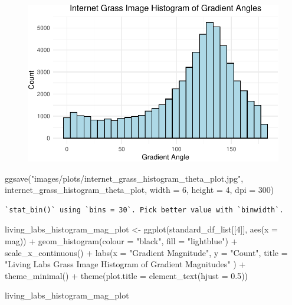 \documentclass[
  letterpaper,
]{report}
\newenvironment{Shaded}{\begin{snugshade}}{\end{snugshade}}
\newcommand{\AttributeTok}[1]{\textcolor[rgb]{0.40,0.45,0.13}{#1}}
\newcommand{\DecValTok}[1]{\textcolor[rgb]{0.68,0.00,0.00}{#1}}
\newcommand{\FloatTok}[1]{\textcolor[rgb]{0.68,0.00,0.00}{#1}}
\newcommand{\FunctionTok}[1]{\textcolor[rgb]{0.28,0.35,0.67}{#1}}
\newcommand{\NormalTok}[1]{\textcolor[rgb]{0.00,0.23,0.31}{#1}}
\newcommand{\OtherTok}[1]{\textcolor[rgb]{0.00,0.23,0.31}{#1}}
\newcommand{\SpecialCharTok}[1]{\textcolor[rgb]{0.37,0.37,0.37}{#1}}
\newcommand{\StringTok}[1]{\textcolor[rgb]{0.13,0.47,0.30}{#1}}
\begin{document}
\begin{figure}[H]

{\centering \includegraphics{results_files/figure-pdf/unnamed-chunk-11-2.pdf}

}

\end{figure}

\begin{Shaded}
\begin{Highlighting}[]
\FunctionTok{ggsave}\NormalTok{(}\StringTok{"images/plots/internet\_grass\_histogram\_theta\_plot.jpg"}\NormalTok{, internet\_grass\_histogram\_theta\_plot, }\AttributeTok{width =} \DecValTok{6}\NormalTok{, }\AttributeTok{height =} \DecValTok{4}\NormalTok{, }\AttributeTok{dpi =} \DecValTok{300}\NormalTok{)}
\end{Highlighting}
\end{Shaded}

\begin{verbatim}
`stat_bin()` using `bins = 30`. Pick better value with `binwidth`.
\end{verbatim}

\begin{Shaded}
\begin{Highlighting}[]
\NormalTok{living\_labs\_histogram\_mag\_plot }\OtherTok{\textless{}{-}}
  \FunctionTok{ggplot}\NormalTok{(standard\_df\_list[[}\DecValTok{4}\NormalTok{]], }
         \FunctionTok{aes}\NormalTok{(}\AttributeTok{x =}\NormalTok{ mag)) }\SpecialCharTok{+}
  \FunctionTok{geom\_histogram}\NormalTok{(}\AttributeTok{colour =} \StringTok{"black"}\NormalTok{, }\AttributeTok{fill =} \StringTok{"lightblue"}\NormalTok{) }\SpecialCharTok{+}
  \FunctionTok{scale\_x\_continuous}\NormalTok{() }\SpecialCharTok{+} 
  \FunctionTok{labs}\NormalTok{(}\AttributeTok{x =} \StringTok{"Gradient Magnitude"}\NormalTok{, }
       \AttributeTok{y =} \StringTok{"Count"}\NormalTok{, }
       \AttributeTok{title =} \StringTok{"Living Labs Grass Image Histogram of Gradient Magnitudes"}
\NormalTok{       ) }\SpecialCharTok{+}
  \FunctionTok{theme\_minimal}\NormalTok{() }\SpecialCharTok{+}
  \FunctionTok{theme}\NormalTok{(}\AttributeTok{plot.title =} \FunctionTok{element\_text}\NormalTok{(}\AttributeTok{hjust =} \FloatTok{0.5}\NormalTok{))}

\NormalTok{living\_labs\_histogram\_mag\_plot}
\end{Highlighting}
\end{Shaded}
\end{document}

